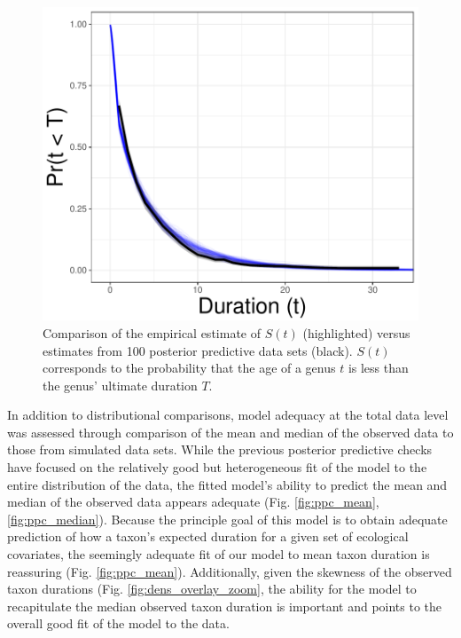 \documentclass[11pt]{article}
\begin{document}
\begin{figure}[ht]
  \centering
  \includegraphics[height = 0.5\textheight,width=\textwidth,keepaspectratio=true]{figure/survival_curves_cweib_cens}
  \caption{Comparison of the empirical estimate of \(S(t)\) (highlighted) versus estimates from 100 posterior predictive data sets (black). \(S(t)\) corresponds to the probability that the age of a genus \(t\) is less than the genus' ultimate duration \(T\). }
  \label{fig:surv}
\end{figure}


In addition to distributional comparisons, model adequacy at the total data level was assessed through comparison of the mean and median of the observed data to those from simulated data sets. While the previous posterior predictive checks have focused on the relatively good but heterogeneous fit of the model to the entire distribution of the data, the fitted model's ability to predict the mean and median of the observed data appears adequate (Fig. \ref{fig:ppc_mean}, \ref{fig:ppc_median}). Because the principle goal of this model is to obtain adequate prediction of how a taxon's expected duration for a given set of ecological covariates, the seemingly adequate fit of our model to mean taxon duration is reassuring (Fig. \ref{fig:ppc_mean}). Additionally, given the skewness of the observed taxon durations (Fig. \ref{fig:dens_overlay_zoom}, the ability for the model to recapitulate the median observed taxon duration is important and points to the overall good fit of the model to the data.
\end{document}
